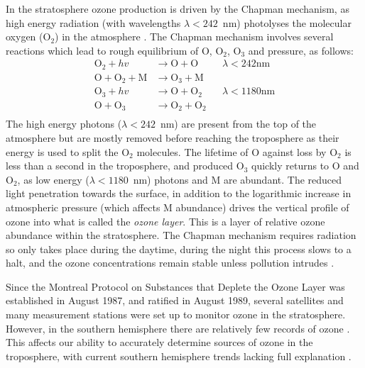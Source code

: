     In the stratosphere ozone production is driven by the Chapman mechanism, as high energy radiation (with wavelengths $\lambda<242$~nm) photolyses the molecular oxygen (O$_2$) in the atmosphere \parencite[][Chapter 3, section 2]{BrasseurJacob2017}.
    The Chapman mechanism involves several reactions which lead to rough equilibrium of O, O$_2$, O$_3$ and pressure, as follows:
    \begin{equation}
      \begin{aligned}
        \text{O}_2 + hv              & \to \text{O}+\text{O}     && \lambda < 242 \text{nm} \\
        \text{O}+\text{O}_2+\text{M} & \to \text{O}_3+\text{M}   &&    \\
        \text{O}_3 + hv              & \to \text{O}+\text{O}_2   && \lambda < 1180 \text{nm} \\
        \text{O} + \text{O}_3        & \to \text{O}_2+\text{O}_2 &&       \\
      \end{aligned}
      \label{LR:O3:eqn_Chapman}
    \end{equation}
    The high energy photons ($\lambda < 242$~nm) are present from the top of the atmosphere but are mostly removed before reaching the troposphere as their energy is used to split the O$_2$ molecules.
    The lifetime of O against loss by O$_2$ is less than a second in the troposphere, and produced O$_3$ quickly returns to O and O$_2$, as low energy ($\lambda < 1180$~nm) photons and M are abundant.
    The reduced light penetration towards the surface, in addition to the logarithmic increase in atmospheric pressure (which affects M abundance) drives the vertical profile of ozone into what is called the \textit{ozone layer}.
    This is a layer of relative ozone abundance within the stratosphere.
    The Chapman mechanism requires radiation so only takes place during the daytime, during the night this process slows to a halt, and the ozone concentrations remain stable unless pollution intrudes \parencite[Chapter 10]{Jacob_1999_book}.
  
    
    Since the Montreal Protocol on Substances that Deplete the Ozone Layer was established in August 1987, and ratified in August 1989, several satellites and many measurement stations were set up to monitor ozone in the stratosphere.
    However, in the southern hemisphere there are relatively few records of ozone \parencite{Huang2017}.
    This affects our ability to accurately determine sources of ozone in the troposphere, with current southern hemisphere trends lacking full explanation \parencite{Zeng2017}. 
  
